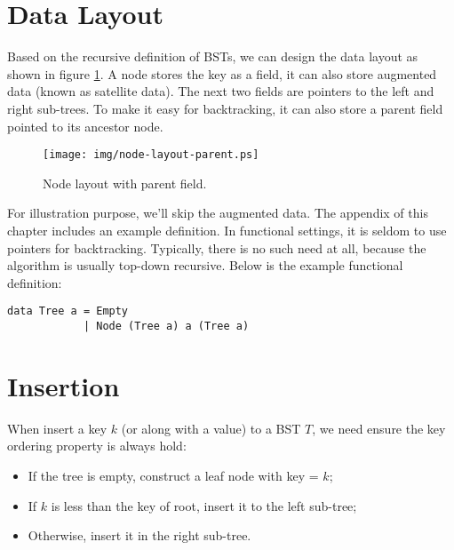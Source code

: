 \documentclass{article}
\begin{document}
\section{Data Layout}

Based on the recursive definition of BSTs, we can design the data layout as shown in figure \ref{fig:node-layout-parent}. A node stores the key as a field, it can also store augmented data (known as satellite data). The next two fields are pointers to the left and right sub-trees. To make it easy for backtracking, it can also store a parent field pointed to its ancestor node.

\begin{figure}[htbp]
       \begin{center}
        \texttt{[image: img/node-layout-parent.ps]}
        \caption{Node layout with parent field.} \label{fig:node-layout-parent}
       \end{center}
\end{figure}

For illustration purpose, we'll skip the augmented data. The appendix of this chapter includes an example definition. In functional settings, it is seldom to use pointers for backtracking. Typically, there is no such need at all, because the algorithm is usually top-down recursive. Below is the example functional definition:

\lstset{language=Haskell}
\begin{lstlisting}
data Tree a = Empty
            | Node (Tree a) a (Tree a)
\end{lstlisting}

\section{Insertion}

When insert a key $k$ (or along with a value) to a BST $T$, we need ensure the key ordering property is always hold:

\begin{itemize}
\item If the tree is empty, construct a leaf node with key = $k$;
\item If $k$ is less than the key of root, insert it to the left sub-tree;
\item Otherwise, insert it in the right sub-tree.
\end{itemize}
\end{document}
